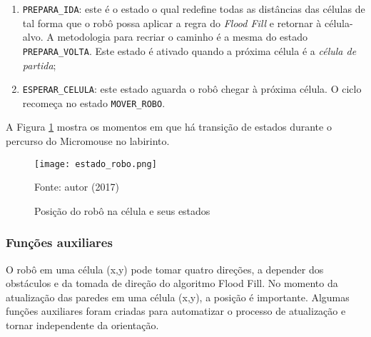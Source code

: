 \begin{enumerate}[leftmargin=2cm,label=\alph*)]
	\item \verb+PREPARA_IDA+: este é o estado o qual redefine todas as distâncias das células de tal forma que o robô possa aplicar a regra do \emph{Flood Fill} e retornar à célula-alvo. A metodologia para recriar o caminho é a mesma do estado \verb+PREPARA_VOLTA+. Este estado é ativado quando a próxima célula é a \emph{célula de partida};
	\item \verb+ESPERAR_CELULA+: este estado aguarda o robô chegar à próxima célula. O ciclo recomeça no estado \verb+MOVER_ROBO+.
\end{enumerate}

A Figura \ref{fig:estados_robo} mostra os momentos em que há transição de estados durante o percurso do Micromouse no labirinto.

\begin{figure}[!htb]
	\caption{\label{fig:estados_robo}Posição do robô na célula e seus estados}
	\begin{center}
		\texttt{[image: estado\_robo.png]}
	\end{center}
	\centering
	\small Fonte: autor (2017)
\end{figure}

\subsubsection{Funções auxiliares}
O robô em uma célula (x,y) pode tomar quatro direções, a depender dos obstáculos e da tomada de direção do algoritmo Flood Fill. No momento da atualização das paredes em uma célula (x,y), a posição é importante. Algumas funções auxiliares foram criadas para automatizar o processo de atualização e tornar independente da orientação.
	
